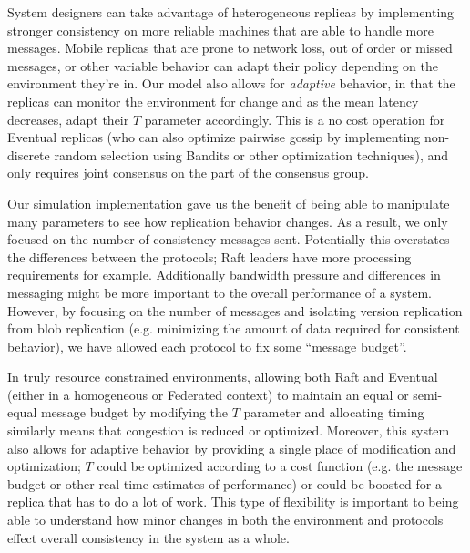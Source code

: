 \documentclass[10pt,conference,letterpaper]{IEEEtran}
\newcommand{\todo}[1]{{\textcolor{red}{#1}}}
\newcommand{\pjk}[1]{[\todo{PJK: #1}]}
\begin{document}
System designers can take advantage of heterogeneous replicas by implementing stronger consistency on more reliable machines that are able to handle more messages. Mobile replicas that are prone to network loss, out of order or missed messages, or other variable behavior can adapt their policy depending on the environment they're in. Our model also allows for \textit{adaptive} behavior, in that the replicas can monitor the environment for change and as the mean latency decreases, adapt their $T$ parameter accordingly. This is a no cost operation for Eventual replicas (who can also optimize pairwise gossip by implementing non-discrete random selection using Bandits or other optimization techniques), and only requires joint consensus on the part of the consensus group.

Our simulation implementation gave us the benefit of being able to manipulate many parameters to see how replication behavior changes. As a result, we only focused on the number of consistency messages sent. Potentially this overstates the differences between the protocols; Raft leaders have more processing requirements for example. Additionally bandwidth pressure and differences in messaging might be more important to the overall performance of a system. However, by focusing on the number of messages and isolating version replication from blob replication (e.g. minimizing the amount of data required for consistent behavior), we have allowed each protocol to fix some ``message budget''.

In truly resource constrained environments, allowing both Raft and Eventual (either in a homogeneous or Federated context) to maintain an equal or semi-equal message budget by modifying the $T$ parameter and allocating timing similarly means that congestion is reduced or optimized. Moreover, this system also allows for adaptive behavior by providing a single place of modification and optimization; $T$ could be optimized according to a cost function (e.g. the message budget or other real time estimates of performance) or could be boosted for a replica that has to do a lot of work. This type of flexibility is important to being able to understand how minor changes in both the environment and protocols effect overall consistency in the system as a whole.

\end{document}
